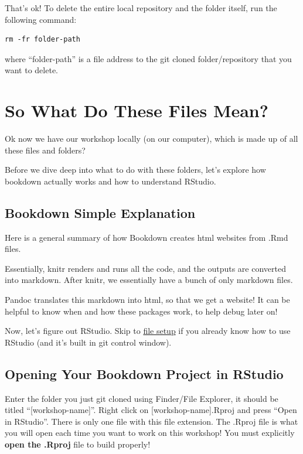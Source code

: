 \documentclass[
]{book}
\theoremstyle{definition}
\theoremstyle{definition}
\theoremstyle{definition}
\theoremstyle{definition}
\theoremstyle{remark}
\begin{document}
That's ok! To delete the entire local repository and the folder itself, run the following command:

\begin{verbatim}
rm -fr folder-path
\end{verbatim}

where ``folder-path'' is a file address to the git cloned folder/repository that you want to delete.

\chapter{So What Do These Files Mean?}\label{file-explanation}

Ok now we have our workshop locally (on our computer), which is made up of all these files and folders?

Before we dive deep into what to do with these folders, let's explore how bookdown actually works and how to understand RStudio.

\section{Bookdown Simple Explanation}\label{bookdown-simple-explanation}

Here is a general summary of how Bookdown creates html websites from .Rmd files.

Essentially, knitr renders and runs all the code, and the outputs are converted into markdown. After knitr, we essentially have a bunch of only markdown files.

Pandoc translates this markdown into html, so that we get a website! It can be helpful to know when and how these packages work, to help debug later on!

Now, let's figure out RStudio. Skip to \hyperref[file-setup]{file setup} if you already know how to use RStudio (and it's built in git control window).

\section{Opening Your Bookdown Project in RStudio}\label{opening-your-bookdown-project-in-rstudio}

Enter the folder you just git cloned using Finder/File Explorer, it should be titled ``{[}workshop-name{]}''. Right click on {[}workshop-name{]}.Rproj and press ``Open in RStudio''. There is only one file with this file extension. The .Rproj file is what you will open each time you want to work on this workshop! You must explicitly \textbf{open the .Rproj} file to build properly!
\end{document}
